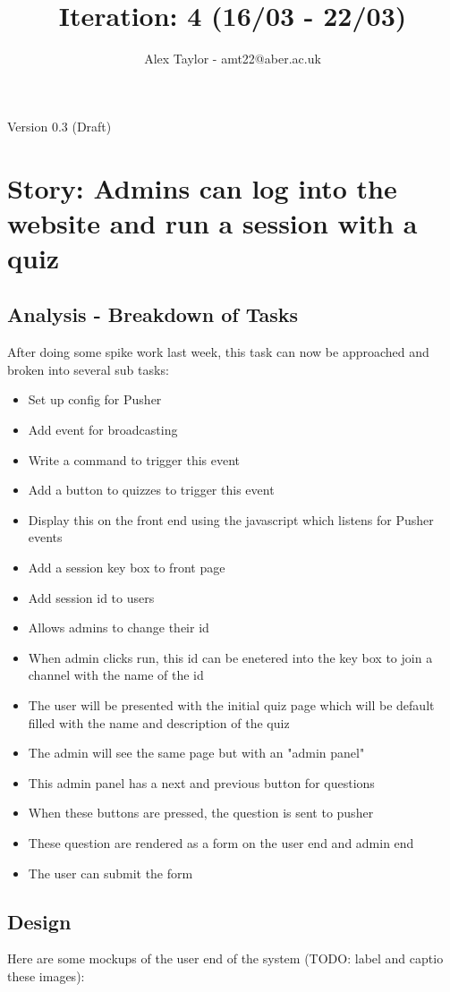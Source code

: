 \documentclass{article}
\title{Iteration: 4 (16/03 - 22/03)}
\author{Alex Taylor - amt22@aber.ac.uk}
\begin{document}
\maketitle
\begin{center}
	Version 0.3 (Draft)
\end{center}
\tableofcontents
\thispagestyle{empty}
\newpage

\section{Story: Admins can log into the website and run a session with a quiz}
\subsection{Analysis - Breakdown of Tasks}
After doing some spike work last week, this task can now be approached and broken into several sub tasks:
\begin{itemize}
	\item Set up config for Pusher
	\item Add event for broadcasting
	\item Write a command to trigger this event
	\item Add a button to quizzes to trigger this event
	\item Display this on the front end using the javascript which listens for Pusher events
	\item Add a session key box to front page
	\item Add session id to users
	\item Allows admins to change their id
	\item When admin clicks run, this id can be enetered into the key box to join a channel with the name of the id
	\item The user will be presented with the initial quiz page which will be default filled with the name and description of the quiz
	\item The admin will see the same page but with an "admin panel"
	\item This admin panel has a next and previous button for questions
	\item When these buttons are pressed, the question is sent to pusher
	\item These question are rendered as a form on the user end and admin end
	\item The user can submit the form
\end{itemize}
\subsection{Design}
Here are some mockups of the user end of the system (TODO: label and captio these images): 
\end{document}
